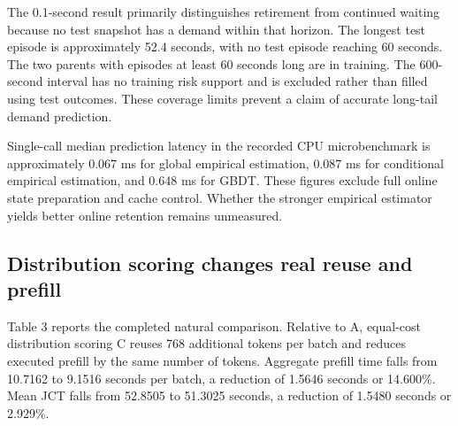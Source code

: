 \documentclass[sigconf, screen, review]{acmart}
\begin{document}


The 0.1-second result primarily distinguishes retirement from continued
waiting because no test snapshot has a demand within that horizon. The
longest test episode is approximately 52.4 seconds, with no test episode
reaching 60 seconds. The two parents with episodes at least 60 seconds
long are in training. The 600-second interval has no training risk
support and is excluded rather than filled using test outcomes. These
coverage limits prevent a claim of accurate long-tail demand prediction.

Single-call median prediction latency in the recorded CPU microbenchmark
is approximately 0.067 ms for global empirical estimation, 0.087 ms for
conditional empirical estimation, and 0.648 ms for GBDT. These figures
exclude full online state preparation and cache control. Whether the
stronger empirical estimator yields better online retention remains
unmeasured.

\subsection{Distribution scoring changes real reuse and
prefill}\label{distribution-scoring-changes-real-reuse-and-prefill}

Table 3 reports the completed natural comparison. Relative to A,
equal-cost distribution scoring C reuses 768 additional tokens per batch
and reduces executed prefill by the same number of tokens. Aggregate
prefill time falls from 10.7162 to 9.1516 seconds per batch, a reduction
of 1.5646 seconds or 14.600\%. Mean JCT falls from 52.8505 to 51.3025
seconds, a reduction of 1.5480 seconds or 2.929\%.
\end{document}
